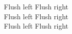 \documentclass{article}
\begin{document}
Flush left \hfill Flush right \\

Flush left \hrulefill Flush right \\

Flush left \dotfill Flush right \\
\end{document}

